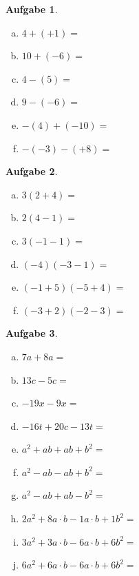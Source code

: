 \documentclass[12pt,fleqn]{article}
\theoremstyle{aufg}
\newtheorem{aufgabe}{Aufgabe}
\theoremstyle{bsp}
\begin{document}
 
    \begin{flushleft}
\begin{aufgabe} ~ \\ 
\begin{multicols}{3} 
\begin{enumerate}[a)] 
\item 
$4+(+1)=$
\item 
$10+(-6)=$
\item 
$4-(5)=$
\item 
$9-(-6)=$
\item 
$-(4)+(-10)=$
\item 
$-(-3)-(+8)=$
\end{enumerate} 
\end{multicols} 
\end{aufgabe} 
\begin{aufgabe} ~ \\ 
\begin{multicols}{3} 
\begin{enumerate}[a)] 
\item 
$3(2+4)=$
\item 
$2(4-1)=$
\item 
$3(-1-1)=$
\item 
$(-4)(-3-1)=$
\item 
$(-1+5)(-5+4)=$
\item 
$(-3+2)(-2-3)=$
\end{enumerate} 
\end{multicols} 
\end{aufgabe} 
\begin{aufgabe} ~ \\ 
\begin{multicols}{2} 
\begin{enumerate}[a)] 
\item 
$7a+8a=$
\item 
$13c-5c=$
\item 
$-19x-9x=$
\item 
$-16t+20c-13t=$
\item 
$a^2+ab+ab+b^2=$
\item 
$a^2-ab-ab+b^2=$
\item 
$a^2-ab+ab-b^2=$
\item 
$2a^2+8a\cdot b-1a\cdot b+1b^2=$
\item 
$3a^2+3a\cdot b-6a\cdot b+6b^2=$
\item 
$6a^2+6a\cdot b-6a\cdot b+6b^2=$
\end{enumerate} 
\end{multicols} 
\end{aufgabe} 

\end{flushleft}
\end{document}

